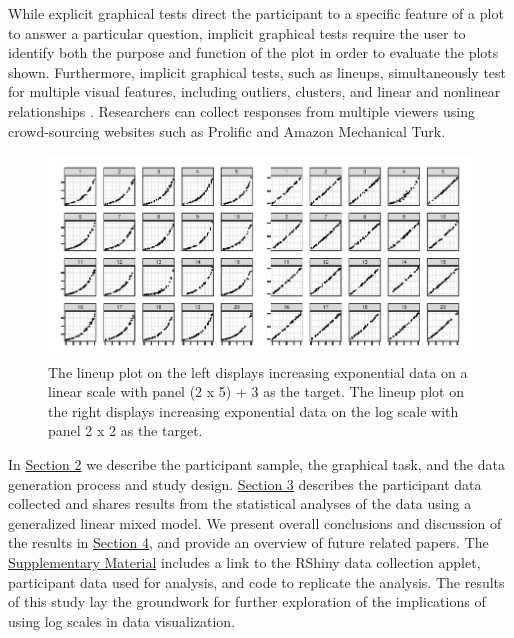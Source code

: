 \documentclass[12pt]{article}
\begin{document}
While explicit graphical tests direct the participant to a specific
feature of a plot to answer a particular question, implicit graphical
tests require the user to identify both the purpose and function of the
plot in order to evaluate the plots shown. Furthermore, implicit
graphical tests, such as lineups, simultaneously test for multiple
visual features, including outliers, clusters, and linear and nonlinear
relationships \citep{vanderplas2015spatial}. Researchers can collect
responses from multiple viewers using crowd-sourcing websites such as
Prolific and Amazon Mechanical Turk.

\begin{figure}[tbp]

{\centering \includegraphics[width=\linewidth,]{logarithmic-lineups_files/figure-latex/lineup-example-1} 

}

\caption[Lineup examples]{The lineup plot on the left displays increasing exponential data on a linear scale with panel (2 x 5) + 3 as the target. The lineup plot on the right displays increasing exponential data on the log scale with panel 2 x 2 as the target.}\label{fig:lineup-example}
\end{figure}

In \protect\hyperlink{methods}{Section 2} we describe the participant
sample, the graphical task, and the data generation process and study
design. \protect\hyperlink{results}{Section 3} describes the participant
data collected and shares results from the statistical analyses of the
data using a generalized linear mixed model. We present overall
conclusions and discussion of the results in
\protect\hyperlink{conclusion-discussion}{Section 4}, and provide an
overview of future related papers. The
\protect\hyperlink{supplementary-material}{Supplementary Material}
includes a link to the RShiny data collection applet, participant data
used for analysis, and code to replicate the analysis. The results of
this study lay the groundwork for further exploration of the
implications of using log scales in data visualization.
\end{document}
